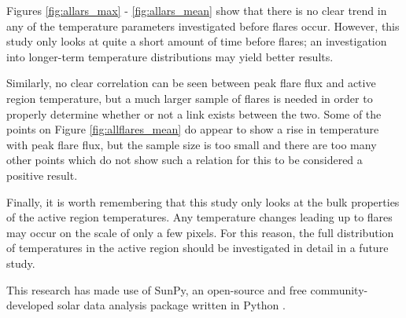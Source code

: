 \documentclass[referee,a4paper,12pt]{swsc}
\begin{document}
\begin{linenumbers}
Figures \ref{fig:allars_max} - \ref{fig:allars_mean} show that there is no clear trend in any of the temperature parameters investigated before flares occur.
However, this study only looks at quite a short amount of time before flares; an investigation into longer-term temperature distributions may yield better results.

Similarly, no clear correlation can be seen between peak flare flux and active region temperature, but a much larger sample of flares is needed in order to properly determine whether or not a link exists between the two.
Some of the points on Figure \ref{fig:allflares_mean} do appear to show a rise in temperature with peak flare flux, but the sample size is too small and there are too many other points which do not show such a relation for this to be considered a positive result.

Finally, it is worth remembering that this study only looks at the bulk properties of the active region temperatures.
Any temperature changes leading up to flares may occur on the scale of only a few pixels.
For this reason, the full distribution of temperatures in the active region should be investigated in detail in a future study.

\begin{acknowledgements}
	This research has made use of SunPy, an open-source and free community-developed solar data analysis package written in Python \citep{Mumford2013}.
\end{acknowledgements}




\end{linenumbers}
\end{document}
